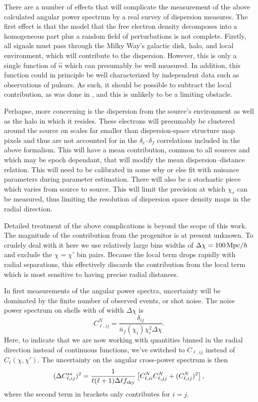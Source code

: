 \documentclass[twocolumn,prl,nofootinbib,floatfix]{revtex4-1}
\begin{document}
There are a number of effects that will complicate the measurement of the
above calculated angular power spectrum by a real survey of dispersion 
measures.  The first effect is
that the model that the free electron density decomposes into a homogeneous
part plus a random field of perturbations is not complete. Firstly, all signals
must pass through the Milky Way's galactic disk, halo, and local environment,
which will contribute to the dispersion. However, this is only a
single function of $\hat n$ which can presumably be well
measured. In addition, this function could in principle be well characterized
by independent data such as observations of pulsars.  As such, it should be
possible to subtract the local
contribution, as was done in
\citet{2014arXiv1412.4829D}, and this is unlikely to be a limiting obstacle.

Perhapse, more concerning is the dispersion from the source's environment
as well as the halo in which it resides. These electrons will presumably be
clustered around the source on scales far smaller than dispersion-space
structure map pixels and thus are not accounted for in the $\delta_e$--$\delta_f$
correlations included in the above formalism.  This will have a mean
contribution, common to all sources and which may be epoch dependant, that will
modify the mean dispersion--distance relation. This will need to be calibrated in some
why or else fit with nuisance parameters during parameter estimation.  There
will also be a stochastic piece which varies from source to source.  This will
limit the precision at which $\chi_s$ can be measured, thus limiting the
resolution of dispersion space density maps in the radial direction.

Detailed treatment of the above complications is beyond the scope of this
work. The magnitude of the contribution from the progenitor is at present
unknown. To crudely deal with it here we use relatively large
bins widths of $\Delta\chi = 100\,{\rm Mpc}/h$ 
and exclude the $\chi = \chi'$ bin pairs.
Because the local term drops rapidly with radial separations, this effectively 
discards the contribution from the local term which is most sensitive to having
precise radial distances.

In first measurements of the angular power spectra, uncertainty will be
dominated by the finite number of observed events, or shot noise.
The noise power spectrum on shells with of width
$\Delta \chi$ is
\begin{equation}
    C^N_{\ell, ij} = \frac{\delta_{ij}}{\bar n_f(\chi_i)\chi_i^2\Delta\chi}.
\end{equation}
Here, to indicate that we are now working with quantities binned in the radial
direction instead of
continuous functions, we've switched to $C_{\ell,ij}$ instead of
$C_\ell(\chi, \chi')$. The uncertainty on the angular
cross-power spectrum is then
\begin{align}
    (\Delta{C^{ss}_{\ell,ij}})^2 = 
    {\frac{1}{\ell(\ell + 1)\Delta \ell f_{\rm sky}}}
        \left[C^N_{\ell,ii} C^N_{\ell,jj} +  (C^N_{\ell,ij})^2\right],
\end{align}
where the second term in brackets only contributes for $i = j$.
\end{document}
